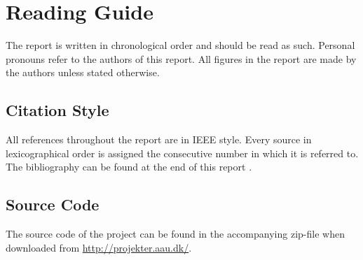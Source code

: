 \chapter*{Reading Guide}
The report is written in chronological order and should be read as such. Personal pronouns refer to the authors of this report. All figures in the report are made by the authors unless stated otherwise.

\section*{Citation Style}
All references throughout the report are in IEEE style. Every source in lexicographical order is assigned the consecutive number in which it is referred to. The bibliography can be found at the end of this report .

\section*{Source Code}
The source code of the project can be found in the accompanying zip-file when downloaded from \url{http://projekter.aau.dk/}.